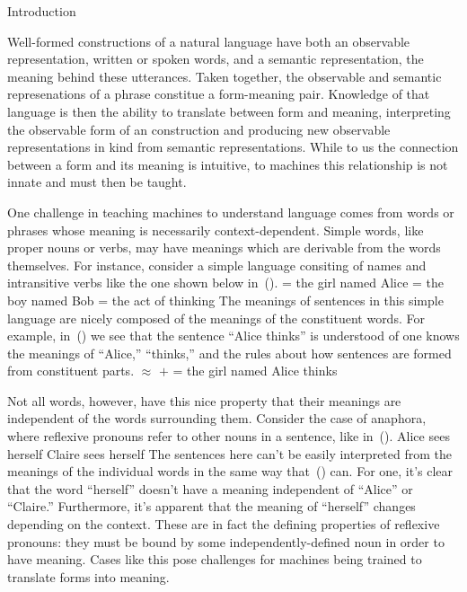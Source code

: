\sec Introduction

Well-formed constructions of a natural language have both an observable 
representation, written or spoken words, and a semantic representation, the
meaning behind these utterances. Taken together, the observable and semantic
represenations of a phrase constitue a form-meaning pair. Knowledge of that
language is then the ability to translate between form and meaning, 
interpreting the observable form of an construction and producing new 
observable representations in kind from semantic representations. While to us
the connection between a form and its meaning is intuitive, to machines this
relationship is not innate and must then be taught. 

One challenge in teaching machines to understand language comes from words or
phrases whose meaning is necessarily context-dependent. Simple words, like
proper nouns or verbs, may have meanings which are derivable from the words 
themselves. For instance, consider a simple language consiting of names and
intransitive verbs like the one shown below in~(\nextx).
\pex
	\a{}   = the girl named Alice
	\a{}  = the boy named Bob
	\a{}  = the act of thinking
\xe
The meanings of sentences in this simple language are nicely composed of the
meanings of the constituent words. For example, in~(\nextx) we see that the
sentence ``Alice thinks'' is understood of one knows the meanings of ``Alice,''
``thinks,'' and the rules about how sentences are formed from constituent 
parts.
\ex{}
	 $\approx$  $+$  = the girl named Alice thinks
\xe

Not all words, however, have this nice property that their meanings are 
independent of the words surrounding them. Consider the case of anaphora, where
reflexive pronouns refer to other nouns in a sentence, like in~(\nextx).
\pex
	\a Alice sees herself
	\a Claire sees herself
\xe
The sentences here can't be easily interpreted from the meanings of the 
individual words in the same way that~(\blastx) can. For one, it's clear that
the word ``herself'' doesn't have a meaning independent of ``Alice'' or 
``Claire.'' Furthermore, it's apparent that the meaning of ``herself'' changes
depending on the context. These are in fact the defining properties of 
reflexive pronouns: they must be bound by some independently-defined noun in
order to have meaning. Cases like this pose challenges for machines being
trained to translate forms into meaning.

